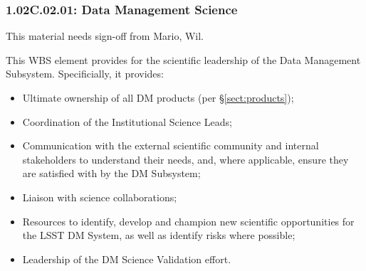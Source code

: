 \subsubsection{1.02C.02.01: Data Management Science}

\begin{note}
This material needs sign-off from Mario, Wil.
\end{note}

This WBS element provides for the scientific leadership of the Data Management
Subsystem. Specificially, it provides:

\begin{itemize}

  \item{Ultimate ownership of all DM products (per \S\ref{sect:products});}

  \item{Coordination of the Institutional Science Leads;}

  \item{Communication with the external scientific community and internal
  stakeholders to understand their needs, and, where applicable, ensure they
  are satisfied with by the DM Subsystem;}

  \item{Liaison with science collaborations;}

  \item{Resources to identify, develop and champion new scientific
  opportunities for the LSST DM System, as well as identify risks where
  possible;}

  \item{Leadership of the DM Science Validation effort.}

\end{itemize}
